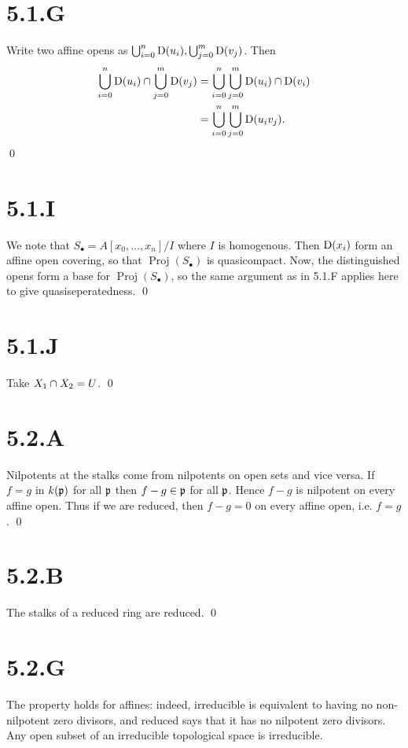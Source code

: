 \documentclass{article}
\begin{document}
\section{5.1.G}
Write two affine opens as $\bigcup_{i=0}^n \operatorname{D}(u_i), \bigcup_{j=0}^m
    \operatorname{D}(v_j)$. Then
\begin{align*}
    \bigcup_{i=0}^n \operatorname{D}(u_i) \cap \bigcup_{j=0}^m \operatorname{D}(v_j) & = \bigcup_{i=0}^n \bigcup_{j=0}^m \operatorname{D}(u_i) \cap \operatorname{D}(v_i) \\
                                                             & = \bigcup_{i=0}^n \bigcup_{j=0}^m \operatorname{D}(u_iv_j).
\end{align*}
\qed

\section{5.1.I}
We note that $S_{\bullet} = A[x_0, \dots, x_n]/I$ where $I$ is
homogenous. Then $\operatorname{D}(x_i)$ form an affine open covering, so that
$\operatorname{Proj}(S_{\bullet})$ is quasicompact. Now, the distinguished opens form a
base for $\operatorname{Proj}(S_{\bullet})$, so the same argument as in 5.1.F applies here
to give quasiseperatedness. \qed

\section{5.1.J}
Take $X_1 \cap X_2 = U$. \qed

\section{5.2.A}
Nilpotents at the stalks come from nilpotents on open sets and vice versa. If
$f=g$ in $k(\mathfrak{p})$ for all
$\mathfrak{p}$ then $f-g \in \mathfrak{p}$ for all
$\mathfrak{p}$. Hence $f-g$ is nilpotent on every
affine open. Thus if we are reduced, then $f-g=0$ on every
affine open, i.e. $f=g$. \qed

\section{5.2.B}
The stalks of a reduced ring are reduced. \qed

\section{5.2.G}
The property holds for affines: indeed, irreducible is equivalent to having no
non-nilpotent zero divisors, and reduced says that it has no nilpotent zero
divisors. Any open subset of an irreducible topological space is irreducible.
\end{document}
